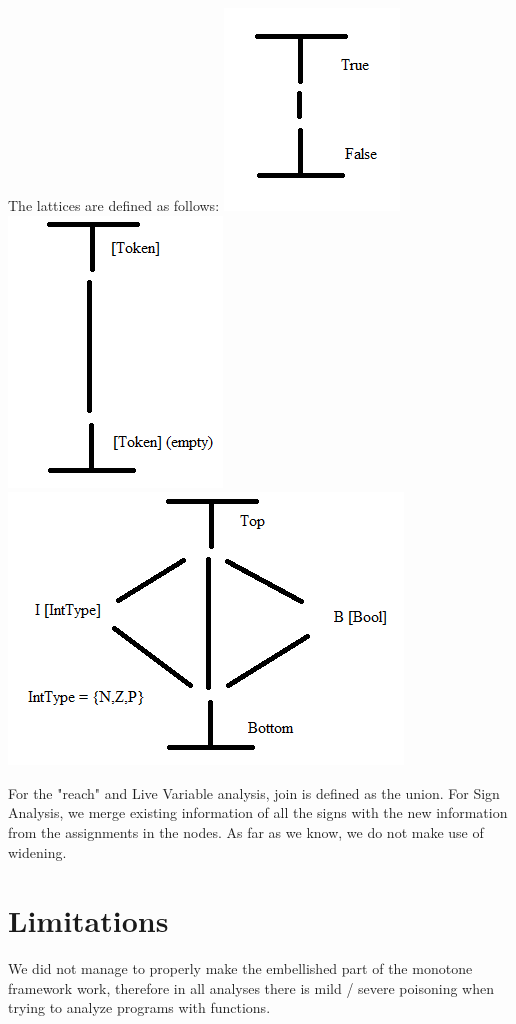 \documentclass[10pt]{article}
\begin{document}
The lattices are defined as follows: %
\includegraphics[scale=0.5]{latticeReach.png}
\includegraphics[scale=0.5]{latticeLive.png}
\includegraphics[scale=0.5]{latticeSign.png}

For the "reach" and Live Variable analysis, join is defined as the union. For Sign Analysis, we merge existing information of all the signs with the new information from the assignments in the nodes. As far as we know, we do not make use of widening.

\section{Limitations}
We did not manage to properly make the embellished part of the monotone framework work, therefore in all analyses there is mild / severe poisoning when trying to analyze programs with functions.
\end{document}
